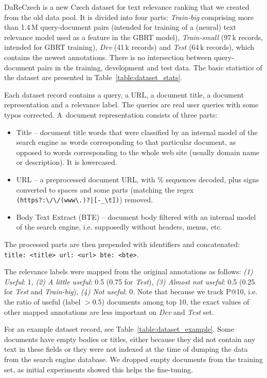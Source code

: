 \documentclass[letterpaper]{article} \usepackage{aaai22 }  \usepackage{times}  \usepackage{helvet}  \usepackage{courier}  \usepackage[hyphens]{url}  \usepackage{graphicx} \usepackage{amsmath,amsfonts,amssymb, mathabx,bm,bbm}
\begin{document}
DaReCzech is a new Czech dataset for text relevance ranking that we created from the old data pool.
It is divided into four parts: \textit{Train-big} comprising more than 1.4\,M query-document pairs (intended for training of a (neural) text relevance model used as a feature in the GBRT model),
\textit{Train-small} (97\,k records, intended for GBRT training), \textit{Dev} (41\,k records) and \textit{Test} (64\,k records), which contains the newest annotations.
There is no intersection between query-document pairs in the training, development and test data. The basic statistics of the dataset are presented in Table~\ref{table:dataset_stats}.

Each dataset record contains a query, a URL, a document title, a document representation and a relevance label.
The queries are real user queries with some typos corrected. A~document representation consists of three parts:
\begin{itemize}
    \item Title -- document title words that were classified by an internal model of the search engine as words corresponding to that particular document, as opposed to words corresponding to the whole web site (usually domain name or description). It is lowercased.
    \item URL -- a preprocessed document URL, with \% sequences decoded, plus signs converted to spaces and some parts (matching the regex \verb#(https?:\/\/(www\.)?|[-_\t])#) removed.
    \item Body Text Extract (BTE) -- document body filtered with an internal model of the search engine, i.e. supposedly without headers, menus, etc.
\end{itemize}
The processed parts are then prepended with identifiers and concatenated: \texttt{title: <title> url: <url> bte: <bte>}. 

The relevance labels were mapped from the original annotations as follows: \textit{(1) Useful}: 1,
\textit{(2) A little useful}: 0.5 (0.75 for \textit{Test}),
\textit{(3) Almost not useful}: 0.5 (0.25 for \textit{Test} and \textit{Train-big}),
\textit{(4) Not useful}: 0.
Note that because we track P@10, i.e. the ratio of useful (label $> 0.5$) documents among top 10, the exact values of other mapped annotations are less important on \textit{Dev} and \textit{Test} set.

For an example dataset record, see Table~\ref{table:dataset_example}. Some documents have empty bodies or titles, either because they did not contain any text in these fields or they were not indexed at the time of dumping the data from the search engine database. We dropped empty documents from the training set, as initial experiments showed  this helps the fine-tuning.
\end{document}
